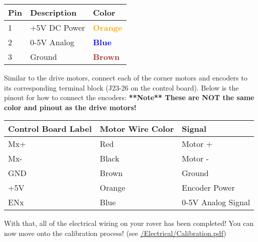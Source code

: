 \documentclass{article}
\begin{document}
\bigskip
\begin{tabular}[3] {| p{3cm} | p{7cm} | p{3cm} | }
	\hline
	\textbf{Pin} & \textbf{Description} & \textbf{Color} \\ \hline
	1 & +5V DC Power & \textcolor{orange}{\textbf{Orange}} \\ \hline
	2 & 0-5V Analog & \textcolor{blue}{\textbf{Blue}} \\ \hline
	3 & Ground & \textcolor{brown}{\textbf{Brown}} \\ \hline
\end{tabular}

\bigskip

Similar to the drive motors, connect each of the corner motors and encoders to its corresponding terminal block (J23-26 on the control board). Below is the pinout for how to connect the encoders: \textbf{**Note** These are NOT the same color and pinout as the drive motors!}

\bigskip

\begin{tabular}[3] {| l | l | l |}
	\hline
	\textbf{Control Board Label} & \textbf{Motor Wire Color} & \textbf{Signal} \\ \hline
	Mx+ & Red & Motor + \\ \hline
	Mx- & Black & Motor - \\ \hline
	GND & Brown & Ground \\ \hline
	+5V & Orange & Encoder Power \\ \hline
	ENx & Blue & 0-5V Analog Signal \\ \hline
	\hline
\end{tabular} 

\bigskip 
With that, all of the electrical wiring on your rover has been completed! You can now move onto the calibration process!  (see \href{https://github.com/nasa-jpl/open-source-rover/blob/master/Electrical/Calibration.pdf}{/Electrical/Calibration.pdf})
\end{document}
